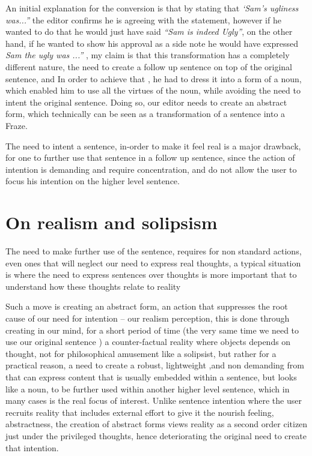 \documentclass[10pt]{article}
\begin{document}
\par
An initial explanation for the conversion is that by stating that \textit{‘Sam’s ugliness was...”} the editor confirms he is agreeing with the statement, however if he wanted to do that he would just have said \textit{“Sam is indeed Ugly”}, on the other hand, if he wanted to show his approval as a side note he would have expressed \textit{Sam the ugly was ...”} , my claim is that this transformation has a completely different nature, the need to create a follow up sentence on top of the original sentence, and In order to achieve that , he had to dress it into a form of a noun, which enabled him to use all the virtues of the noun, while avoiding the need to intent the original sentence. Doing so, our editor needs to create an abstract form, which technically can be seen as  a transformation of a sentence into a Fraze.
\par
The need to intent a sentence, in-order to make it feel real is a major drawback, for one to further use that sentence in a follow up sentence, since the action of intention is demanding and require concentration, and do not allow the user to focus his intention on the higher level sentence.\par

\newpage 
\section*{On realism and solipsism}
The need to make further use of the sentence, requires  for non standard actions, even ones that will neglect our need to express real thoughts, a typical situation is where the need to express sentences over thoughts is more important that to understand how these thoughts relate to reality\par
Such a move is creating an abstract form, an action that suppresses the root cause of our need for intention – our realism perception, this is done through creating in our mind, for a short period of time (the very same time we need to use our original sentence ) a counter-factual reality where objects depends on thought, not for  philosophical amusement like a solipsist, but rather for a practical reason, a need to create a robust, lightweight ,and non demanding  from that can express content that is usually embedded within a sentence, but looks like a noun, to be further used within another higher level sentence, which in many cases is the real focus of interest. Unlike sentence intention where the user recruits reality that includes external effort to give it the nourish feeling, abstractness, the creation of abstract forms views reality as a second order citizen just under the privileged thoughts, hence deteriorating the original need to create that intention.\par
\end{document}
